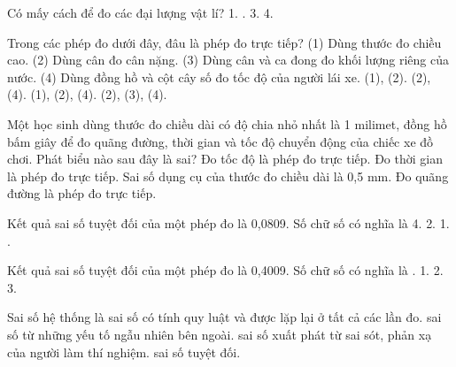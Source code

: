 \begin{ex}
Có mấy cách để đo các đại lượng vật lí?
\choice
{1.}
{.}
{3.}
{4.}
\end{ex}

\begin{ex}
Trong các phép đo dưới đây, đâu là phép đo trực tiếp?
(1) Dùng thước đo chiều cao.
(2) Dùng cân đo cân nặng.
(3) Dùng cân và ca đong đo khối lượng riêng của nước.
(4) Dùng đồng hồ và cột cây số đo tốc độ của người lái xe.
\choice
{\True (1), (2).}
{(2), (4).}
{(1), (2), (4).}
{(2), (3), (4).}
\end{ex}

\begin{ex}
Một học sinh dùng thước đo chiều dài có độ chia nhỏ nhất là 1 milimet, đồng
hồ bấm giây để đo quãng đường, thời gian và tốc độ chuyển động của chiếc xe đồ chơi.
Phát biểu nào sau đây là sai?
\choice
{\True Đo tốc độ là phép đo trực tiếp.}
{Đo thời gian là phép đo trực tiếp.}
{Sai số dụng cụ của thước đo chiều dài là 0,5 mm.}
{Đo quãng đường là phép đo trực tiếp.}
\end{ex}

\begin{ex}
Kết quả sai số tuyệt đối của một phép đo là 0,0809. Số chữ số có nghĩa là
\choice
{4.}
{2.}
{1.}
{.}
\end{ex}

\begin{ex}
Kết quả sai số tuyệt đối của một phép đo là 0,4009. Số chữ số có nghĩa là
\choice
{.}
{1.}
{2.}
{3.}
\end{ex}

\begin{ex}
Sai số hệ thống là
\choice
{\True sai số có tính quy luật và được lặp lại ở tất cả các lần đo.}
{sai số từ những yếu tố ngẫu nhiên bên ngoài.}
{sai số xuất phát từ sai sót, phản xạ của người làm thí nghiệm.}
{sai số tuyệt đối.}
\end{ex}

